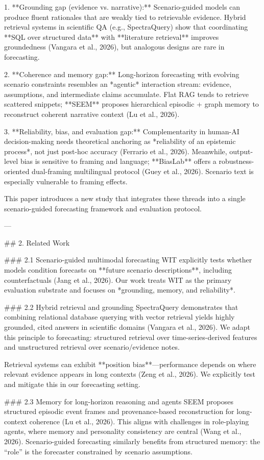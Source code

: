 1. **Grounding gap (evidence vs. narrative):** Scenario-guided models can produce fluent rationales that are weakly tied to retrievable evidence. Hybrid retrieval systems in scientific QA (e.g., SpectraQuery) show that coordinating **SQL over structured data** with **literature retrieval** improves groundedness (Vangara et al., 2026), but analogous designs are rare in forecasting.

2. **Coherence and memory gap:** Long-horizon forecasting with evolving scenario constraints resembles an *agentic* interaction stream: evidence, assumptions, and intermediate claims accumulate. Flat RAG tends to retrieve scattered snippets; **SEEM** proposes hierarchical episodic + graph memory to reconstruct coherent narrative context (Lu et al., 2026).

3. **Reliability, bias, and evaluation gap:** Complementarity in human-AI decision-making needs theoretical anchoring as *reliability of an epistemic process*, not just post-hoc accuracy (Ferrario et al., 2026). Meanwhile, output-level bias is sensitive to framing and language; **BiasLab** offers a robustness-oriented dual-framing multilingual protocol (Guey et al., 2026). Scenario text is especially vulnerable to framing effects.

This paper introduces a new study that integrates these threads into a single scenario-guided forecasting framework and evaluation protocol.

---

## 2. Related Work  

### 2.1 Scenario-guided multimodal forecasting  
WIT explicitly tests whether models condition forecasts on **future scenario descriptions**, including counterfactuals (Jang et al., 2026). Our work treats WIT as the primary evaluation substrate and focuses on *grounding, memory, and reliability*.

### 2.2 Hybrid retrieval and grounding  
SpectraQuery demonstrates that combining relational database querying with vector retrieval yields highly grounded, cited answers in scientific domains (Vangara et al., 2026). We adapt this principle to forecasting: structured retrieval over time-series-derived features and unstructured retrieval over scenario/evidence notes.

Retrieval systems can exhibit **position bias**—performance depends on where relevant evidence appears in long contexts (Zeng et al., 2026). We explicitly test and mitigate this in our forecasting setting.

### 2.3 Memory for long-horizon reasoning and agents  
SEEM proposes structured episodic event frames and provenance-based reconstruction for long-context coherence (Lu et al., 2026). This aligns with challenges in role-playing agents, where memory and personality consistency are central (Wang et al., 2026). Scenario-guided forecasting similarly benefits from structured memory: the “role” is the forecaster constrained by scenario assumptions.

